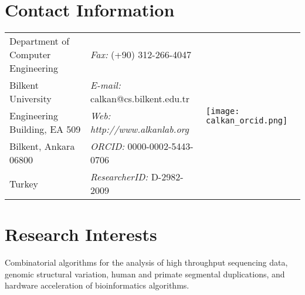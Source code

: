 \documentclass[margin,line]{res}
\begin{document}

\begin{resume}

  \section{\sc Contact Information}
  \vspace{.05in}
  \begin{tabular}{@{}p{2.5in}p{2.3in}p{1in}}
 Department of Computer Engineering & {\it Fax:}    (+90) 312-266-4047  & \multirow{5}{*}{\texttt{[image: calkan\_orcid.png]}}\\            
    Bilkent University   & {\it E-mail:}  calkan@cs.bilkent.edu.tr & \\         
    Engineering Building, EA 509   & {\it Web: http://www.alkanlab.org} &\\        
    Bilkent, Ankara 06800 & {\it ORCID: } 0000-0002-5443-0706 &\\ 
    Turkey & {\it ResearcherID: } D-2982-2009 &\\ 
  \end{tabular}


  
  
  \section{\sc Research Interests}
  Combinatorial algorithms for the analysis of high throughput sequencing data, 
  genomic structural variation,  human and primate
  segmental duplications, and hardware acceleration of bioinformatics algorithms. %


\end{resume}
\end{document}

